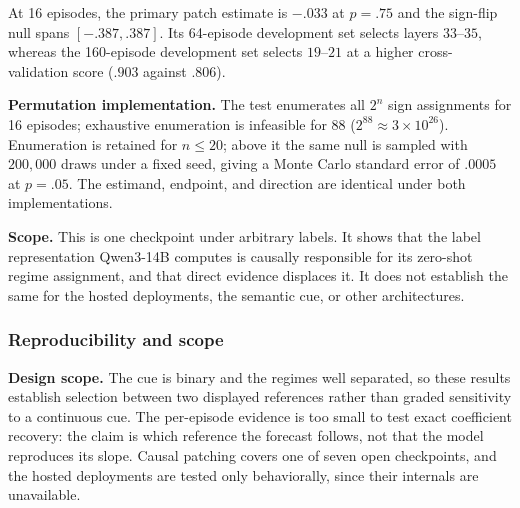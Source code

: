 At 16 episodes, the primary patch estimate is $-.033$ at $p=.75$ and the sign-flip
null spans $[-.387,.387]$. Its 64-episode development set selects layers
$33$--$35$, whereas the 160-episode development set selects $19$--$21$ at a
higher cross-validation score ($.903$ against $.806$).

\noindent\textbf{Permutation implementation.} The test enumerates all $2^{n}$ sign
assignments for 16 episodes; exhaustive enumeration is infeasible for 88
($2^{88}\approx3\times10^{26}$). Enumeration is retained for $n\le20$; above it
the same null is sampled with $200{,}000$ draws under a fixed seed, giving a
Monte Carlo standard error of $.0005$ at $p=.05$. The estimand, endpoint, and
direction are identical under both implementations.

\noindent\textbf{Scope.} This is one checkpoint under arbitrary labels. It shows that
the label representation Qwen3-14B computes is causally responsible for its
zero-shot regime assignment, and that direct evidence displaces it. It does not
establish the same for the hosted deployments, the semantic cue, or other
architectures.

\subsubsection{Reproducibility and scope}

\noindent\textbf{Design scope.} The cue is binary and the regimes well
separated, so these results establish selection between two displayed
references rather than graded sensitivity to a continuous cue. The per-episode
evidence is too small to test exact coefficient recovery: the claim is which
reference the forecast follows, not that the model reproduces its slope. Causal
patching covers one of seven open checkpoints, and the hosted deployments are
tested only behaviorally, since their internals are unavailable.

